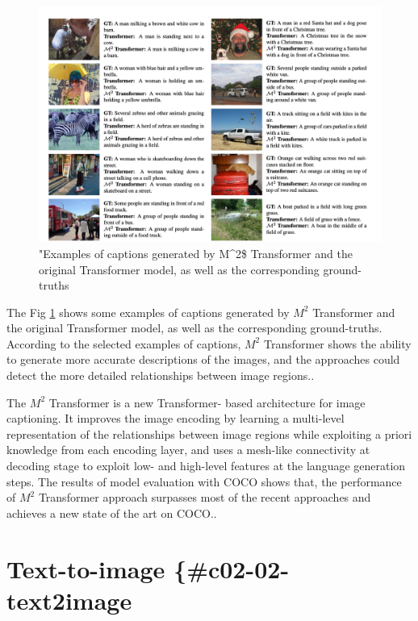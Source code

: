 \documentclass[
]{krantz}
\begin{document}
\begin{figure}

{\centering \includegraphics[width=1\linewidth]{figures/02-01/02-02 example2} 

}

\caption{"Examples of captions generated by M\^{}2\$ Transformer and the original Transformer model, as well as the corresponding ground-truths \citep{cornia2020m2}}\label{fig:example2}
\end{figure}

The Fig \ref{fig:example2} shows some examples of captions generated by \(M^2\) Transformer and the original Transformer model, as well as the corresponding ground-truths. According to the selected examples of captions, \(M^2\) Transformer shows the ability to generate more accurate descriptions of the images, and the approaches could detect the more detailed relationships between image regions.\citep{cornia2020m2}.

The \(M^2\) Transformer is a new Transformer- based architecture for image captioning. It improves the image encoding by learning a multi-level representation of the relationships between image regions while exploiting a priori knowledge from each encoding layer, and uses a mesh-like connectivity at decoding stage to exploit low- and high-level features at the language generation steps. The results of model evaluation with COCO shows that, the performance of \(M^2\) Transformer approach surpasses most of the recent approaches and achieves a new state of the art on COCO.\citep{cornia2020m2}.

\hypertarget{text-to-image-c02-02-text2image}{%
\section{Text-to-image \{\#c02-02-text2image}\label{text-to-image-c02-02-text2image}}
\end{document}
